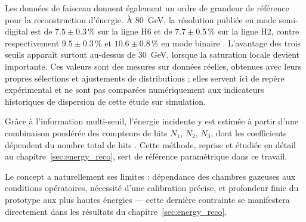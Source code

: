 Les données de faisceau donnent également un ordre de grandeur de référence pour la reconstruction d'énergie. À 80~GeV, la résolution publiée en mode semi-digital est de \(7.5\pm0.3\,\%\) sur la ligne H6 et de \(7.7\pm0.5\,\%\) sur la ligne H2, contre respectivement \(9.5\pm0.3\,\%\) et \(10.6\pm0.8\,\%\) en mode binaire \cite{calice2016sdhcal}. L'avantage des trois seuils apparaît surtout au-dessus de 30~GeV, lorsque la saturation locale devient importante. Ces valeurs sont des mesures sur données réelles, obtenues avec leurs propres sélections et ajustements de distributions ; elles servent ici de repère expérimental et ne sont pas comparées numériquement aux indicateurs historiques de dispersion de cette étude sur simulation.

Grâce à l'information multi-seuil, l'énergie incidente y est estimée à partir d'une combinaison pondérée des compteurs de hits \(N_1\), \(N_2\), \(N_3\), dont les coefficients dépendent du nombre total de hits \cite{calice2016sdhcal}. Cette méthode, reprise et étudiée en détail au chapitre~\ref{sec:energy_reco}, sert de référence paramétrique dans ce travail.

Le concept a naturellement ses limites : dépendance des chambres gazeuses aux conditions opératoires, nécessité d'une calibration précise, et profondeur finie du prototype aux plus hautes énergies — cette dernière contrainte se manifestera directement dans les résultats du chapitre~\ref{sec:energy_reco}.
